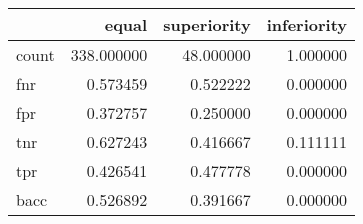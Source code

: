 \begin{tabular}{lrrr}
\toprule
{} &       equal &  superiority &  inferiority \\
\midrule
count &  338.000000 &    48.000000 &     1.000000 \\
fnr   &    0.573459 &     0.522222 &     0.000000 \\
fpr   &    0.372757 &     0.250000 &     0.000000 \\
tnr   &    0.627243 &     0.416667 &     0.111111 \\
tpr   &    0.426541 &     0.477778 &     0.000000 \\
bacc  &    0.526892 &     0.391667 &     0.000000 \\
\bottomrule
\end{tabular}
